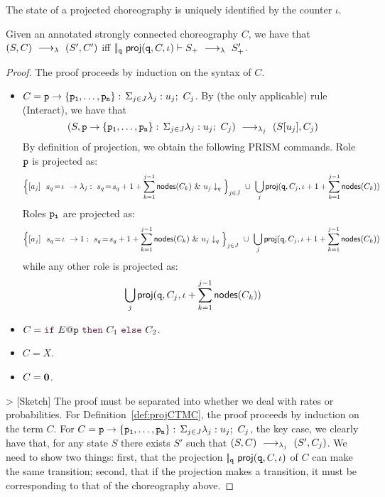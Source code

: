 \begin{lemma}
  The state of a projected choreography is uniquely identified by the
  counter $\iota$.
\end{lemma}

\begin{theorem}[Projection]\label{thm:epp}
  Given an annotated strongly connected choreography $C$, we have that
  $(S,C) \ \longrightarrow_{\lambda}\  (S', C')$ iff
  $|\!|_{\mathtt{q}}\ \mathsf{proj} (\mathtt{q}, C,\iota)\vdash S_{+} \ \longrightarrow_{\lambda}\ 
  S_{+}'$.
\end{theorem}
\begin{proof}
  The proof proceeds by induction on the syntax of $C$.
  \begin{itemize}
  \item $C=\mathtt{p}\rightarrow \{\mathtt{\mathtt{p}_1,\ldots,\mathtt{p}_n}\}:\,\Sigma_{j\in J}\lambda_j: u_j;\ C_j$.  By (the only
    applicable) rule \textsf{(Interact)}, we have that
    \[
      (S, \mathtt{p}\rightarrow \{\mathtt{\mathtt{p}_1,\ldots,\mathtt{p}_n}\}:\,\Sigma_{j\in J}\lambda_j: u_j;\ C_j)
      \ \longrightarrow_{\lambda_j}\  (S[u_j], C_j) 
    \]
    By definition of projection, we obtain the following PRISM
    commands. Role $\mathtt{p}$ is projected as:
    \[
      \Big\{[a_j]\ \ s_{q}\!=\! \iota\ \rightarrow \lambda_j:\ s_{q}\!=\!
        s_{q} +1+\sum_{k=1}^{j-1}\mathsf{nodes}({C_k})\ \&\ u_j\downarrow_q\Big\}_{j\in J}
      \ \cup\ \bigcup_{j} \mathsf{proj} (\mathtt{q}, C_j,
      \iota+1+\sum_{k=1}^{j-1}\mathsf{nodes}({C_k}))
    \]
    Roles $\mathtt{p_i}$ are projected as:
    \[
      \Big\{[a_j]\ \ s_{q}\!=\! \iota\ \rightarrow 1:\ s_{q}\!=\!
        s_{q} +1+\sum_{k=1}^{j-1}\mathsf{nodes}({C_k})\ \&\ u_j\downarrow_q\Big\}_{j\in J}
      \ \cup\ \bigcup_{j} \mathsf{proj} (\mathtt{q}, C_j, \iota+1+\sum_{k=1}^{j-1}\mathsf{nodes}({C_k}))
    \]
    while any other role is projected as: 
    \[\bigcup_{j} \mathsf{proj} (\mathtt{q}, C_j, \iota+\sum_{k=1}^{j-1}\mathsf{nodes}({C_k}))
    \]

  \item $C=\ifTE {E}{p}{C_1}{C_2}$.

  \item $C=X$.

  \item $C=\mathbf{0}$.

  \end{itemize}




  > [Sketch] The proof must be separated into whether we deal with
  rates or probabilities. For Definition~\ref{def:projCTMC}, the proof
  proceeds by induction on the term $C$. For
  $C=\mathtt{p}\rightarrow \{\mathtt{\mathtt{p}_1,\ldots,\mathtt{p}_n}\}:\,\Sigma_{j\in J}\lambda_j: u_j;\ C_j$, the key case, we
  clearly have that, for any state $S$ there exists $S'$ such that
  $(S,C)\ \longrightarrow_{\lambda_j}\ (S',C_j)$. We need to show two things: first,
  that the projection $|\!|_{\mathtt{q}}\ \mathsf{proj}{(\mathtt{q},C,\iota)}$ of $C$
  can make the same transition; second, that if the projection makes a
  transition, it must be corresponding to that of the choreography
  above.


\end{proof}
